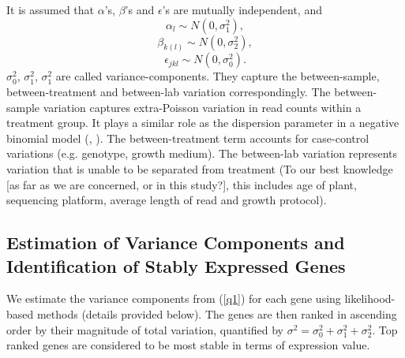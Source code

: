 \documentclass[11pt, a4paper]{article}
\begin{document}
It is assumed that $\alpha$'s, $\beta$'s and $\epsilon$'s are mutually
independent, and  
  \[\alpha_l\sim N(0, \sigma^2_1),\] 
  \[\beta_{k(l)}\sim N(0, \sigma^2_2),\]
   \[\epsilon_{jkl}\sim N(0, \sigma_0^2).\]
$\sigma_0^2$, $\sigma_1^2$, $\sigma_1^2$ are called variance-components. They capture the
between-sample, between-treatment and between-lab variation
correspondingly. The between-sample variation captures extra-Poisson variation in read counts
within a treatment group. It plays a similar role as the dispersion parameter
in a negative binomial model (\cite{anders2010differential}, \cite{di2011nbp}).
The between-treatment term accounts for case-control variations (e.g. genotype, growth medium). 
The between-lab variation represents variation that is unable to be separated from treatment (To our best knowledge [as far as we are concerned,  or in this study?], this includes age of plant, sequencing platform, average length of read and growth protocol).


\subsection*{ Estimation of
Variance Components
and
Identification of Stably Expressed Genes 
}

We estimate the variance components from (\ref{q1}) for each gene using
likelihood-based methods (details provided below).  The
genes are then ranked  in ascending order by their magnitude of total
variation, quantified by $\sigma^2 = \sigma^2_0 + \sigma_1^2 + \sigma_2^2$.
Top ranked genes are considered to be most stable in terms of expression
value. 
\end{document}
